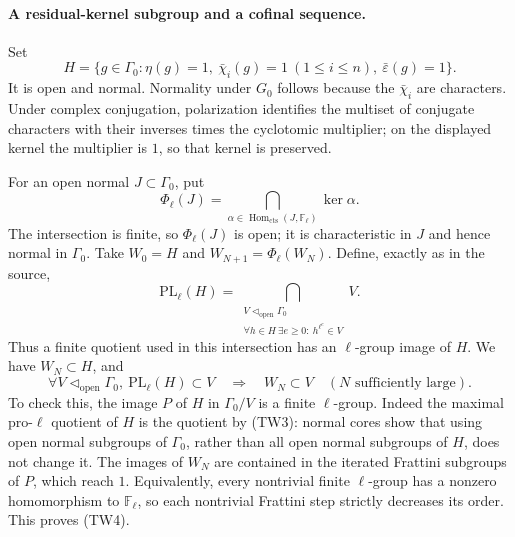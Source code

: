 \paragraph{A residual-kernel subgroup and a cofinal sequence.}
Set
\[
 H=\{g\in\Gamma_0:\eta(g)=1,\ 
          \bar\chi_i(g)=1\ (1\leq i\leq n),\
          \bar\varepsilon(g)=1\}.
 \tag{TW2}
\]
It is open and normal.
Normality under \(G_0\) follows because the \(\bar\chi_i\) are
characters.  Under complex conjugation, polarization identifies
the multiset of conjugate characters with their inverses times
the cyclotomic multiplier; on the displayed kernel the multiplier
is \(1\), so that kernel is preserved.

For an open normal \(J\subset\Gamma_0\), put
\[
 \Phi_\ell(J)=
       \bigcap_{\alpha\in
          \operatorname{Hom}_{\mathrm{cts}}(J,\mathbb F_\ell)}
                         \ker\alpha .
\]
The intersection is finite, so \(\Phi_\ell(J)\) is open;
it is characteristic in \(J\) and hence normal in \(\Gamma_0\).
Take \(W_0=H\) and \(W_{N+1}=\Phi_\ell(W_N)\).
Define, exactly as in the source,
\[
 \mathrm{PL}_\ell(H)=
 \bigcap_{\substack{V\triangleleft_{\mathrm{open}}\Gamma_0\\
     \forall h\in H\ \exists e\geq0:\ h^{\ell^e}\in V}}V.
 \tag{TW3}
\]
Thus a finite quotient used in this intersection has an
\(\ell\)-group image of \(H\).
We have \(W_N\subset H\), and
\[
 \forall V\triangleleft_{\mathrm{open}}\Gamma_0,\
 \mathrm{PL}_\ell(H)\subset V
 \quad\Longrightarrow\quad
 W_N\subset V\quad(N\text{ sufficiently large}).
 \tag{TW4}
\]
To check this, the image \(P\) of \(H\) in \(\Gamma_0/V\)
is a finite \(\ell\)-group.
Indeed the maximal pro-\(\ell\) quotient of \(H\) is the quotient
by (TW3): normal cores show that using open normal subgroups
of \(\Gamma_0\), rather than all open normal subgroups of \(H\),
does not change it.
The images of \(W_N\) are contained in the iterated Frattini
subgroups of \(P\), which reach \(1\).
Equivalently, every nontrivial finite \(\ell\)-group has a
nonzero homomorphism to \(\mathbb F_\ell\), so each nontrivial
Frattini step strictly decreases its order.
This proves (TW4).

